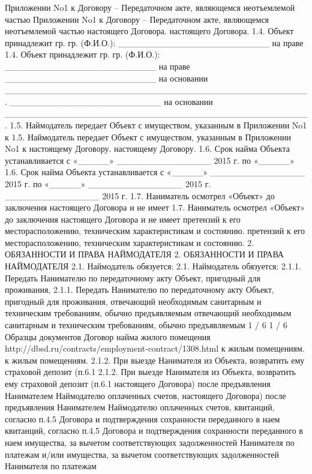 Приложении No1 к Договору – Передаточном акте, являющемся неотъемлемой частью
Приложении No1 к Договору – Передаточном акте, являющемся неотъемлемой частью
настоящего Договора.
настоящего Договора.
1.4. Объект принадлежит гр. гр. (Ф.И.О.): ________________________ на праве
1.4. Объект принадлежит гр. гр. (Ф.И.О.): ________________________ на праве
________________________ на основании
________________________________________________.
________________________ на основании
________________________________________________.
1.5. Наймодатель передает Объект с имуществом, указанным в Приложении No1 к
1.5. Наймодатель передает Объект с имуществом, указанным в Приложении No1 к
настоящему Договору.
настоящему Договору.
1.6. Срок найма Объекта устанавливается с «_____» _______________ 2015 г. по
«_____»
1.6. Срок найма Объекта устанавливается с «_____» _______________ 2015 г. по
«_____»
_______________ 2015 г.
_______________ 2015 г.
1.7. Наниматель осмотрел «Объект» до заключения настоящего Договора и не имеет
1.7. Наниматель осмотрел «Объект» до заключения настоящего Договора и не имеет
претензий к его месторасположению, техническим характеристикам и состоянию.
претензий к его месторасположению, техническим характеристикам и состоянию.
2. ОБЯЗАННОСТИ И ПРАВА НАЙМОДАТЕЛЯ
2. ОБЯЗАННОСТИ И ПРАВА НАЙМОДАТЕЛЯ
2.1. Наймодатель обязуется:
2.1. Наймодатель обязуется:
2.1.1. Передать Нанимателю по передаточному акту Объект, пригодный для
проживания,
2.1.1. Передать Нанимателю по передаточному акту Объект, пригодный для
проживания,
отвечающий необходимым санитарным и техническим требованиям, обычно
предъявляемым
отвечающий необходимым санитарным и техническим требованиям, обычно
предъявляемым
                                                1 / 6
                                                1 / 6
Образцы документов
Договор найма жилого помещения
http://dbsd.ru/contracts/employment-contract/1308.html
к жилым помещениям.
к жилым помещениям.
2.1.2. При выезде Нанимателя из Объекта, возвратить ему страховой депозит (п.6.1
2.1.2. При выезде Нанимателя из Объекта, возвратить ему страховой депозит (п.6.1
настоящего Договора) после предъявления Нанимателем Наймодателю оплаченных
счетов,
настоящего Договора) после предъявления Нанимателем Наймодателю оплаченных
счетов,
квитанций, согласно п.4.5 Договора и подтверждения сохранности переданного в
наем
квитанций, согласно п.4.5 Договора и подтверждения сохранности переданного в
наем
имущества, за вычетом соответствующих задолженностей Нанимателя по платежам
и/или
имущества, за вычетом соответствующих задолженностей Нанимателя по платежам
